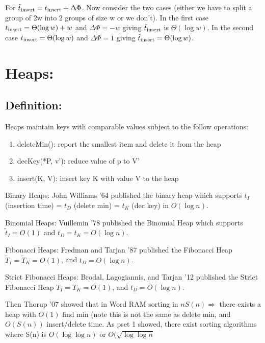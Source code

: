 \documentclass[11pt]{article}
\begin{document}
For $\tilde{t}_{\textnormal{insert}} = t_{\textnormal{insert}} + \Delta \Phi$.  Now consider the two cases (either we have to split a group of 2w into 2 groups of size w or we don't).  In the first case $t_{\textnormal{insert}} = \Theta(\log w) + w$ and $\Delta \Phi = -w$ giving $\tilde{t}_{\textnormal{insert}}$ is $\Theta(\log w)$.  In the second case $t_{\textnormal{insert}} = \Theta(\log w)$ and $\Delta \Phi = 1$ giving $\tilde{t}_{\textnormal{insert}} = \Theta(\log w)$. 

\section{Heaps:}

\subsection{Definition:} Heaps maintain keys with comparable values subject to the follow operations:

\begin{enumerate}
\item deleteMin(): report the smallest item and delete it from the heap
\item decKey(*P, v'): reduce value of p to V'
\item insert(K, V): insert key K with value V to the heap
\end{enumerate}

Binary Heaps:  John Williams '64 \cite{CACM '64} published the binary heap which supports $t_I$ (insertion time) = $t_D$ (delete min) = $t_K$ (dec key) in $O(\log n)$.

Binomial Heaps: Vuillemin '78 \cite{ACM '78} published the Binomial Heap which supports $\tilde{t}_I = O(1)$ and $t_D = t_K = O(\log n)$.

Fibonacci Heaps: Fredman and Tarjan '87 \cite{JACM '87} published the Fibonacci Heap $\tilde{T}_I = \tilde{T}_K = O(1)$, and $t_D = O(\log n)$.

Strict Fibonacci Heaps: Brodal, Lagogiannis, and Tarjan '12 \cite{STOC '12} published the Strict Fibonacci Heap ${T_I} = {T_K} = O(1)$, and $t_D = O(\log n)$.

Then Thorup '07 \cite{JACM '07} showed that in Word RAM sorting in $n S(n) \Rightarrow $ there exists a heap with $O(1)$ find min (note this is not the same as delete min, and $O(S(n))$ insert/delete time.  As pset 1 showed, there exist sorting algorithms where S(n) is $O(\log \log n)$ or $O(\sqrt{\log \log n}$
\end{document}
